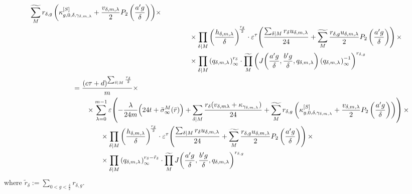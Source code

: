\documentclass{article}
\begin{document}
\begin{align}
\begin{split}
{      \gensum[M]
      r_{\delta,g}
      \left(
        \kappa_{g,0,\delta,\gamma_{\delta,m,\lambda}}^{[S]}
        +
        \frac{v_{\delta,m,\lambda}}{2} P_2\left(\frac{a' g}{\delta}\right)
      \right)}
  \times\\
  & \qquad\qquad\times
    \divisorprod{M}
    \left(\frac{h_{\delta,m,\lambda}}{\delta}\right)^{\!\frac{r_\delta}{2}}
    \cdot
    \unityPowerTau{
    \frac{\divisorsum{M} r_\delta
        u_{\delta,m,\lambda}}{24}
      +
    \gensum[M]
    \frac{r_{\delta,g} u_{\delta,m,\lambda}}{2} P_2\left(\frac{a'
        g}{\delta}\right)
    }
  \times
  \\
  &\qquad\qquad
  \times
  \divisorprod{M}
  \eulerFunction[q_{\delta,m,\lambda}]{}^{r_\delta}
  \cdot
  \genprod[M]
  \left(
    \jacobiAlpha{\frac{a' g}{\delta}}{\frac{b' g}{\delta}}{q_{\delta,m,\lambda}}
    \eulerFunction[q_{\delta,m,\lambda}]{}^{-1}
  \right)^{r_{\delta,g}}
  \end{split}
  \notag\\
  \begin{split}
  &=
    \frac{(c\tau+d)^{\divisorsum{M} \frac{r_\delta}{2}}}{m}
  \times\\
  & \qquad\times
  \sum_{\lambda=0}^{m-1}
    \unityPower{-\frac{\lambda}{24m}\Bigl(24t+\sigmainftybar[M]{\bar{r}}\Bigr)
      + \divisorsum{M}\frac{r_\delta(v_{\delta,m\lambda}
        + \kappa_{\gamma_{\delta,m,\lambda}})}{24}
      +
      \gensum[M]
      r_{\delta,g}
      \left(
        \kappa_{g,0,\delta,\gamma_{\delta,m,\lambda}}^{[S]}
        +
        \frac{v_{\delta,m,\lambda}}{2} P_2\left(\frac{a' g}{\delta}\right)
      \right)}
  \times\\
  & \qquad\qquad\times
    \divisorprod{M}
    \left(\frac{h_{\delta,m,\lambda}}{\delta}\right)^{\!\frac{r_\delta}{2}}
    \cdot
    \unityPowerTau{
    \frac{\divisorsum{M} r_\delta
        u_{\delta,m,\lambda}}{24}
      +
    \gensum[M]
    \frac{r_{\delta,g} u_{\delta,m,\lambda}}{2} P_2\left(\frac{a'
        g}{\delta}\right)
    }
  \times
  \\
  &\qquad\qquad
  \times
  \divisorprod{M}
  \eulerFunction[q_{\delta,m,\lambda}]{}^{r_\delta - \tilde{r}_\delta}
  \cdot
  \genprod[M]
  \jacobiAlpha{\frac{a' g}{\delta}}
              {\frac{b' g}{\delta}}
              {q_{\delta,m,\lambda}}^{r_{\delta,g}}
  \end{split}
  \label{eq:p_rbar-m-t(gamma*tau)}
\end{align}
where
$\tilde{r}_\delta := \sum_{0 < g < \frac{\delta}{2}} r_{\delta,g}$.
\end{document}
